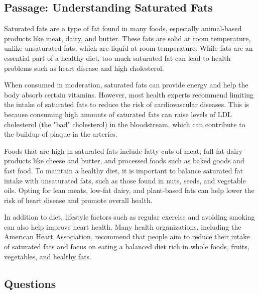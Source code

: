 \documentclass[12pt]{article}
\begin{document}
\onehalfspacing

\subsection*{Passage: Understanding Saturated Fats}

\begin{tcolorbox}[colframe=black!40, colback=gray!5]
\begin{spacing}{1.15}
    Saturated fats are a type of fat found in many foods, especially animal-based products like meat, dairy, and butter. These fats are solid at room temperature, unlike unsaturated fats, which are liquid at room temperature. While fats are an essential part of a healthy diet, too much saturated fat can lead to health problems such as heart disease and high cholesterol.
    
    When consumed in moderation, saturated fats can provide energy and help the body absorb certain vitamins. However, most health experts recommend limiting the intake of saturated fats to reduce the risk of cardiovascular diseases. This is because consuming high amounts of saturated fats can raise levels of LDL cholesterol (the "bad" cholesterol) in the bloodstream, which can contribute to the buildup of plaque in the arteries.
    
    Foods that are high in saturated fats include fatty cuts of meat, full-fat dairy products like cheese and butter, and processed foods such as baked goods and fast food. To maintain a healthy diet, it is important to balance saturated fat intake with unsaturated fats, such as those found in nuts, seeds, and vegetable oils. Opting for lean meats, low-fat dairy, and plant-based fats can help lower the risk of heart disease and promote overall health.
    
    In addition to diet, lifestyle factors such as regular exercise and avoiding smoking can also help improve heart health. Many health organizations, including the American Heart Association, recommend that people aim to reduce their intake of saturated fats and focus on eating a balanced diet rich in whole foods, fruits, vegetables, and healthy fats.
\end{spacing}
\end{tcolorbox}

\subsection*{Questions}
\end{document}
